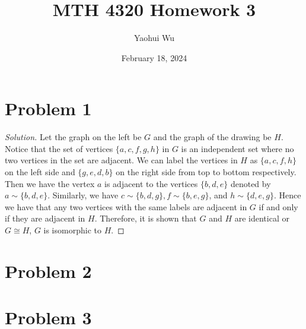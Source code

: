 \documentclass[12pt]{article}
\title{MTH 4320 Homework 3}
\author{Yaohui Wu}
\date{February 18, 2024}
\newenvironment{solution}{\begin{proof}[Solution]}{\end{proof}}
\begin{document}
\maketitle
\section*{Problem 1}
\begin{solution}
    Let the graph on the left be \(G\) and the graph of the drawing be \(H\).
    Notice that the set of vertices \(\{a,c,f,g,h\}\) in \(G\) is an independent
    set where no two vertices in the set are adjacent. We can label the vertices
    in \(H\) as \(\{a,c,f,h\}\) on the left side and \(\{g,e,d,b\}\) on the right
    side from top to bottom respectively. Then we have the vertex \(a\) is adjacent
    to the vertices \(\{b,d,e\}\) denoted by \(a\sim\{b,d,e\}\). Similarly, we have
    \(c\sim\{b,d,g\},f\sim\{b,e,g\}\), and \(h\sim\{d,e,g\}\). Hence we have that
    any two vertices with the same labels are adjacent in \(G\) if and only if
    they are adjacent in \(H\). Therefore, it is shown that \(G\) and \(H\) are
    identical or \(G\cong H\), \(G\) is isomorphic to \(H\).
\end{solution}
\section*{Problem 2}
\section*{Problem 3}
\end{document}
